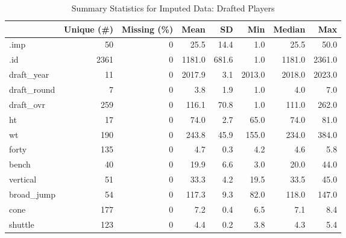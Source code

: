 \documentclass[12pt,english]{article}
\begin{document}
\begin{table}
\caption{Summary Statistics for Imputed Data: Drafted Players}
\centering
\begin{tabular}[t]{lrrrrrrr}
\toprule
  & Unique (\#) & Missing (\%) & Mean & SD & Min & Median & Max\\
\midrule
.imp & 50 & 0 & \num{25.5} & \num{14.4} & \num{1.0} & \num{25.5} & \num{50.0}\\
.id & 2361 & 0 & \num{1181.0} & \num{681.6} & \num{1.0} & \num{1181.0} & \num{2361.0}\\
draft\_year & 11 & 0 & \num{2017.9} & \num{3.1} & \num{2013.0} & \num{2018.0} & \num{2023.0}\\
draft\_round & 7 & 0 & \num{3.8} & \num{1.9} & \num{1.0} & \num{4.0} & \num{7.0}\\
draft\_ovr & 259 & 0 & \num{116.1} & \num{70.8} & \num{1.0} & \num{111.0} & \num{262.0}\\
ht & 17 & 0 & \num{74.0} & \num{2.7} & \num{65.0} & \num{74.0} & \num{81.0}\\
wt & 190 & 0 & \num{243.8} & \num{45.9} & \num{155.0} & \num{234.0} & \num{384.0}\\
forty & 135 & 0 & \num{4.7} & \num{0.3} & \num{4.2} & \num{4.6} & \num{5.8}\\
bench & 40 & 0 & \num{19.9} & \num{6.6} & \num{3.0} & \num{20.0} & \num{44.0}\\
vertical & 51 & 0 & \num{33.3} & \num{4.2} & \num{19.5} & \num{33.5} & \num{45.0}\\
broad\_jump & 54 & 0 & \num{117.3} & \num{9.3} & \num{82.0} & \num{118.0} & \num{147.0}\\
cone & 177 & 0 & \num{7.2} & \num{0.4} & \num{6.5} & \num{7.1} & \num{8.4}\\
shuttle & 123 & 0 & \num{4.4} & \num{0.2} & \num{3.8} & \num{4.3} & \num{5.4}\\
\bottomrule
\end{tabular}
\end{table}
\end{document}
